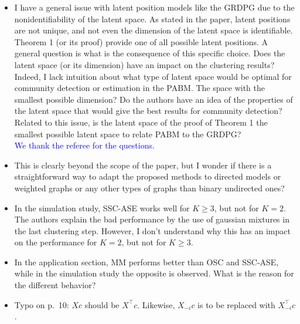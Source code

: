 \documentclass[
]{article}
\begin{document}
\begin{itemize}
\item
  I have a general issue with latent position models like the GRDPG due
  to the nonidentifiability of the latent space. As stated in the paper,
  latent positions are not unique, and not even the dimension of the
  latent space is identifiable. Theorem 1 (or its proof) provide one of
  all possible latent positions. A general question is what is the
  consequence of this specific choice. Does the latent space (or its
  dimension) have an impact on the clustering results? Indeed, I lack
  intuition about what type of latent space would be optimal for
  community detection or estimation in the PABM. The space with the
  smallest possible dimension? Do the authors have an idea of the
  properties of the latent space that would give the best results for
  community detection? Related to this issue, is the latent space of the
  proof of Theorem 1 the smallest possible latent space to relate PABM
  to the GRDPG?\\
  \textcolor{blue}{
  We thank the referee for the questions.
  }
\item
  This is clearly beyond the scope of the paper, but I wonder if there
  is a straightforward way to adapt the proposed methods to directed
  models or weighted graphs or any other types of graphs than binary
  undirected ones?
\item
  In the simulation study, SSC-ASE works well for \(K \geq 3\), but not
  for \(K = 2\). The authors explain the bad performance by the use of
  gaussian mixtures in the last clustering step. However, I don't
  understand why this has an impact on the performance for \(K = 2\),
  but not for \(K \geq 3\).
\item
  In the application section, MM performs better than OSC and SSC-ASE,
  while in the simulation study the opposite is observed. What is the
  reason for the different behavior?
\item
  Typo on p.~10: \(X c\) should be \(X^\top c\). Likewise, \(X_{-i} c\)
  is to be replaced with \(X_{-i}^\top c\).
\end{itemize}

  
\end{document}
